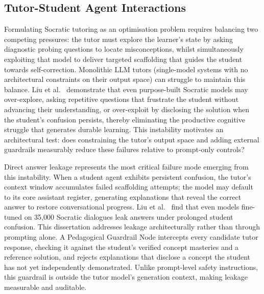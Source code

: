 \documentclass[11pt,a4paper]{report}
\begin{document}
\subsection{Tutor-Student Agent Interactions}
Formulating Socratic tutoring as an optimisation problem requires balancing two competing pressures: the tutor must explore the learner's state by asking diagnostic probing questions to locate misconceptions, whilst simultaneously exploiting that model to deliver targeted scaffolding that guides the student towards self-correction. Monolithic LLM tutors (single-model systems with no architectural constraints on their output space) can struggle to maintain this balance. Liu et al.\ \cite{liu2024socraticlm} demonstrate that even purpose-built Socratic models may over-explore, asking repetitive questions that frustrate the student without advancing their understanding, or over-exploit by disclosing the solution when the student's confusion persists, thereby eliminating the productive cognitive struggle that generates durable learning. This instability motivates an architectural test: does constraining the tutor's output space and adding external guardrails measurably reduce these failures relative to prompt-only controls?

Direct answer leakage represents the most critical failure mode emerging from this instability. When a student agent exhibits persistent confusion, the tutor's context window accumulates failed scaffolding attempts; the model may default to its core assistant register, generating explanations that reveal the correct answer to restore conversational progress. Liu et al.\ \cite{liu2024socraticlm} find that even models fine-tuned on 35,000 Socratic dialogues leak answers under prolonged student confusion. This dissertation addresses leakage architecturally rather than through prompting alone. A Pedagogical Guardrail Node intercepts every candidate tutor response, checking it against the student's verified concept masteries and a reference solution, and rejects explanations that disclose a concept the student has not yet independently demonstrated. Unlike prompt-level safety instructions, this guardrail is outside the tutor model's generation context, making leakage measurable and auditable.
\end{document}
